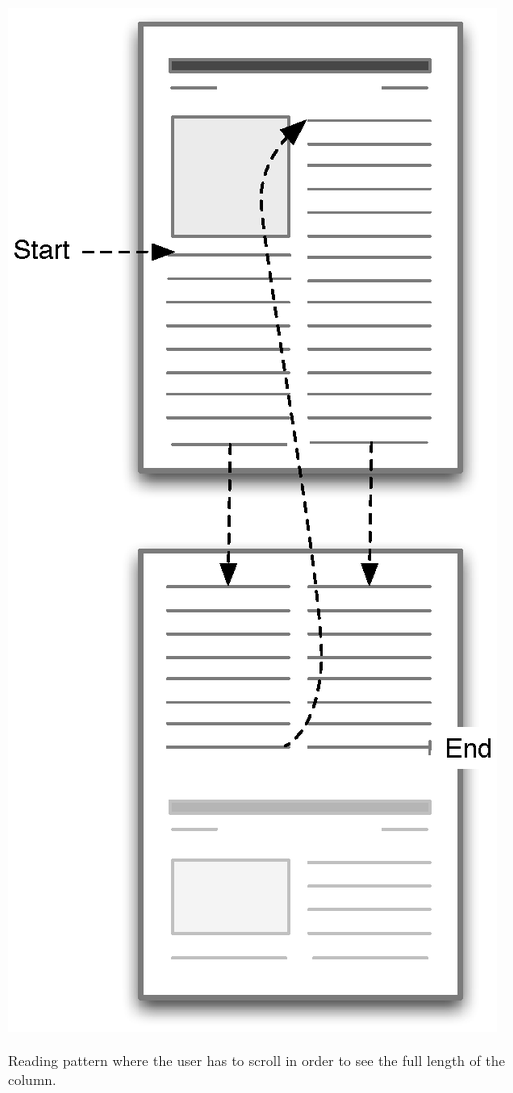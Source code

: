 
\begin{sidefigure}%
\centering%
\includegraphics[width=\marginparwidth]{img/reading1} 
\caption{Reading pattern where the user has to scroll in order to see the full length of the column.}%
\label{fig:reading1}%
\end{sidefigure}
